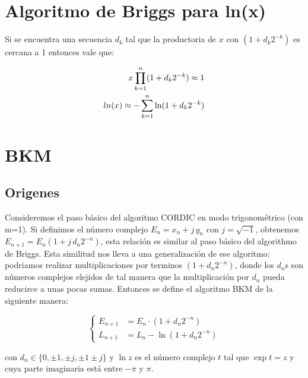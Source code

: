 \documentclass[10pt,a4paper]{book}
\begin{document}
\chapter{Algoritmo de Briggs para ln(x)}

Si se encuentra una secuencia $d_k$ tal que la productoria de $x$ con $(1+d_k 2^{-k})$ es cercana a 1 entonces vale que:

\begin{equation} \label{eq:briggs_ln}
   \begin{subequations}
      \begin{aligned}
         x \prod_{k=1}^{n} (1+d_k 2^{-k}) \approx 1     \\
         ln(x) \approx - \sum_{k=1}^{n} \ln(1+d_k 2^{-k})
      \end{aligned}
   \end{subequations}
\end{equation}


\chapter{BKM}

   \section{Origenes}

   Consideremos el paso básico del algoritmo CORDIC en modo trigonométrico (con m=1).
   Si definimos el número complejo $E_n = x_n + j \, y_n$ con $j=\sqrt{-1}$, obtenemos $E_{n+1} = E_n (1+j \, d_n 2^{-n})$, esta relación es similar al paso básico del algorithmo de Briggs.
   Esta similitud nos lleva a una generalización de ese algoritmo: podriamos realizar multiplicaciones por terminos $(1+d_n 2^{-n})$, donde los $d_n$s son números complejos elejidos de tal manera que la multiplicación por $d_n$ pueda reducirce a unas pocas sumas.
   Entonces se define el algoritmo BKM de la siguiente manera:

\begin{equation} \label{eq:bkm_eqs}
   \left\{
      \begin{aligned}
         E_{n+1} &= E_n \cdot (1 + d_n 2^{-n})   \\
         L_{n+1} &= L_n - \ln(1 + d_n 2^{-n})
      \end{aligned}
   \right.
\end{equation}

   con $d_n \in \{ 0, \pm 1, \pm j, \pm 1 \pm j\}$ y $\ln z$ es el número complejo $t$ tal que $\exp{t} = z$ y cuya parte imaginaria está entre $-\pi$ y $\pi$.
\end{document}
